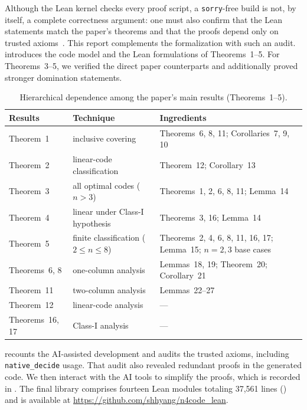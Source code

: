 \documentclass[12pt]{article}
\begin{document}
Although the Lean kernel checks every proof script, a \texttt{sorry}-free
build is not, by itself, a complete correctness argument: one must also
confirm that the Lean statements match the paper's theorems and that the
proofs depend only on trusted axioms~\cite{Lean4,flyspeck}.
This report complements the formalization with such an audit.
 introduces the code model and the Lean formulations of
Theorems~1--5.
For Theorems~3--5, we verified the direct paper counterparts and additionally
proved stronger domination statements.


\begin{table}[t]
  \centering
  \caption{Hierarchical dependence among the paper's main results (Theorems~1--5).}
  \label{tab:proof-hierarchy}
  \small
  \begin{tabular}{@{}llp{}@{}}
  \toprule
  \textbf{Results} & \textbf{Technique} & \textbf{Ingredients} \\
  \midrule
  Theorem~1 & inclusive covering & Theorems~6, 8, 11; Corollaries~7, 9, 10 \\
  Theorem~2 & linear-code classification & Theorem~12; Corollary~13 \\
  Theorem~3 & all optimal codes ($n>3$) & Theorems~1, 2, 6, 8, 11; Lemma~14 \\
  Theorem~4 & linear under Class-I hypothesis & Theorems~3, 16; Lemma~14 \\
  Theorem~5 & finite classification ($2\le n\le 8$) & Theorems~2, 4, 6, 8, 11, 16, 17; Lemma~15; $n=2,3$ base cases \\
  Theorems~6, 8 & one-column analysis & Lemmas~18, 19; Theorem~20; Corollary~21 \\
  Theorem~11 & two-column analysis & Lemmas~22--27 \\
  Theorem~12 & linear-code analysis & --- \\
  Theorems~16, 17 & Class-I analysis & --- \\
  \bottomrule
  \end{tabular}
\end{table}


 recounts the AI-assisted development and
audits the trusted axioms, including \texttt{native\_decide} usage.
That audit also revealed redundant proofs in the generated code. We then interact with the AI tools to simplify the proofs, which is recorded in .
The final library comprises fourteen Lean modules totaling 37{,}561 lines
() and is available at
\url{https://github.com/shhyang/n4code_lean}.
\end{document}
